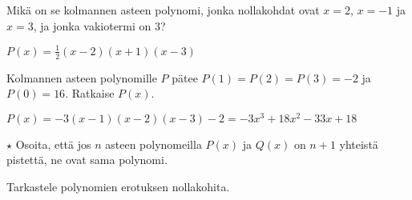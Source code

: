 \begin{tehtavasivu}
\begin{tehtava}
    Mikä on se kolmannen asteen polynomi, jonka nollakohdat ovat $x=2$, $x=-1$ ja $x=3$, ja jonka vakiotermi on $3$?
    \begin{vastaus}
        $P(x)=\frac{1}{2}(x-2)(x+1)(x-3)$
    \end{vastaus}
\end{tehtava}


\begin{tehtava}
    Kolmannen asteen polynomille $P$ pätee $P(1)=P(2)=P(3)=-2$ ja $P(0)=16$. Ratkaise $P(x)$.
    \begin{vastaus}
        $P(x)=-3(x-1)(x-2)(x-3)-2=-3x^3+18x^2-33x+18$
    \end{vastaus}
\end{tehtava}

\begin{tehtava}
$\star$   	Osoita, että jos $n$ asteen polynomeilla $P(x)$ ja $Q(x)$ on $n+1$ yhteistä pistettä, ne ovat sama polynomi.
    \begin{vastaus}
        Tarkastele polynomien erotuksen nollakohita.
    \end{vastaus}
\end{tehtava}

\end{tehtavasivu}